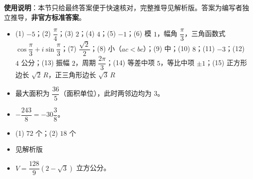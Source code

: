 
\begin{gknotice}
\textbf{使用说明}：本节只给最终答案便于快速核对，完整推导见解析版。答案为编写者独立推导，\textbf{非官方标准答案}。
\end{gknotice}

\begin{itemize}[leftmargin=2.6em]
  \item[\textbf{1.}] (1) $-5$；(2) $\dfrac{\pi}{4}$；(3) $2$；(4) $4$；(5) $-1$；(6) 模 $1$，幅角 $\dfrac{\pi}{3}$，三角函数式 $\cos\dfrac{\pi}{3}+i\sin\dfrac{\pi}{3}$；(7) $\dfrac{\sqrt2}{2}$；(8) 小（$ac<bc$）；(9) 中；(10) $8$；(11) $-3$；(12) $4$ 公分；(13) 振幅 $2$，周期 $\dfrac{2\pi}{3}$；(14) 等差中项 $5$，等比中项 $\pm1$；(15) 正方形边长 $\sqrt2\,R$，正三角形边长 $\sqrt3\,R$
  \item[\textbf{2.}] 最大面积为 $\dfrac{36}{5}$（面积单位），此时两邻边均为 $3$。
  \item[\textbf{3.}] $-\dfrac{243}{8}=-30\dfrac{3}{8}$。
  \item[\textbf{4.}] (1) $72$ 个；(2) $18$ 个
  \item[\textbf{5.}] 见解析版
  \item[\textbf{6.}] $V=\dfrac{128}{9}(2-\sqrt3)$ 立方公分。
\end{itemize}
